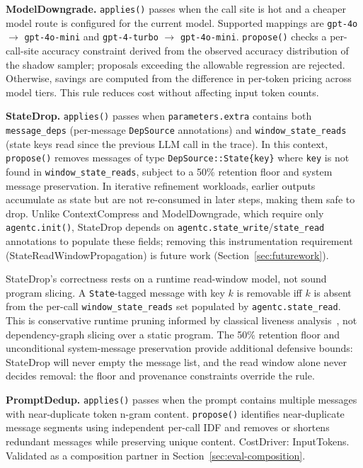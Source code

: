 \textbf{ModelDowngrade.} \texttt{applies()} passes when the call site is hot and a
cheaper model route is configured for the current model. Supported mappings are
\texttt{gpt-4o} $\rightarrow$ \texttt{gpt-4o-mini} and \texttt{gpt-4-turbo}
$\rightarrow$ \texttt{gpt-4o-mini}. \texttt{propose()} checks a per-call-site
accuracy constraint derived from the observed accuracy distribution of the shadow
sampler; proposals exceeding the allowable regression are rejected. Otherwise, savings
are computed from the difference in per-token pricing across model tiers. This rule
reduces cost without affecting input token counts.

\textbf{StateDrop.} \texttt{applies()} passes when \texttt{parameters.extra} contains
both \texttt{message\_deps} (per-message \texttt{DepSource} annotations) and
\texttt{window\_state\_reads} (state keys read since the previous LLM call in the
trace). In this context, \texttt{propose()} removes messages of type
\texttt{DepSource::State\{key\}} where \texttt{key} is not found in
\texttt{window\_state\_reads}, subject to a 50\% retention floor and system message
preservation. In iterative refinement workloads, earlier outputs accumulate as state
but are not re-consumed in later steps, making them safe to drop. Unlike ContextCompress
and ModelDowngrade, which require only \texttt{agentc.init()}, StateDrop depends on
\texttt{agentc.state\_write}/\texttt{state\_read} annotations to populate these fields;
removing this instrumentation requirement (StateReadWindowPropagation) is future work
(Section~\ref{sec:futurework}).

StateDrop's correctness rests on a runtime read-window model, not sound program
slicing. A \texttt{State}-tagged message with key $k$ is removable iff $k$ is absent
from the per-call \texttt{window\_state\_reads} set populated by
\texttt{agentc.state\_read}. This is conservative runtime pruning informed by
classical liveness
analysis~\cite{allen1976dataflow,weiser1981slicing,tip1995survey}, not
dependency-graph slicing over a static program. The 50\% retention floor and
unconditional system-message preservation provide additional defensive bounds:
StateDrop will never empty the message list, and the read window alone never decides
removal: the floor and provenance constraints override the rule.

\textbf{PromptDedup.} \texttt{applies()} passes when the prompt contains multiple
messages with near-duplicate token n-gram content. \texttt{propose()} identifies
near-duplicate message segments using independent per-call IDF and removes or shortens
redundant messages while preserving unique content. CostDriver: InputTokens. Validated
as a composition partner in Section~\ref{sec:eval-composition}.

